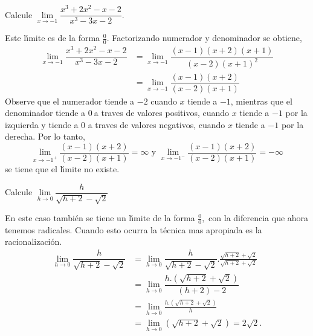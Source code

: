 \begin{example}
Calcule $\lim\limits_{x\rightarrow-1}\dfrac{x^{3}+2x^{2}-x-2}{x^{3}-3x-2}.$
\end{example}

\begin{sol}
Este l\'{\i}mite es de la forma $\frac{0}{0}.$ Factorizando numerador y
denominador se obtiene,%
\begin{align*}
\lim\limits_{x\rightarrow-1}\dfrac{x^{3}+2x^{2}-x-2}{x^{3}-3x-2}  &
=\lim\limits_{x\rightarrow-1}\dfrac{\left(  x-1\right)  \left(  x+2\right)
\left(  x+1\right)  }{\left(  x-2\right)  \left(  x+1\right)  ^{2}}\\
&  =\lim\limits_{x\rightarrow-1}\dfrac{\left(  x-1\right)  \left(  x+2\right)
}{\left(  x-2\right)  \left(  x+1\right)  }%
\end{align*}
Observe que el numerador tiende a $-2$ cuando $x$ tiende a $-1$, mientras que
el denominador tiende a $0\ $a traves de valores positivos, cuando $x$ tiende
a $-1$ por la izquierda y tiende a $0$ a traves de valores negativos, cuando
$x$ tiende a $-1$ por la derecha. Por lo tanto,%
\[
\lim\limits_{x\rightarrow-1^{+}}\dfrac{\left(  x-1\right)  \left(  x+2\right)
}{\left(  x-2\right)  \left(  x+1\right)  }=\infty\text{ \ y \ }%
\lim\limits_{x\rightarrow-1^{-}}\dfrac{\left(  x-1\right)  \left(  x+2\right)
}{\left(  x-2\right)  \left(  x+1\right)  }=-\infty
\]
se tiene que el l\'{\i}mite no existe.
\end{sol}

\begin{example}
Calcule $\lim\limits_{h\rightarrow0}\dfrac{h}{\sqrt{h+2}-\sqrt{2}}$
\end{example}

\begin{sol}
En este caso tambi\'{e}n se tiene un l\'{\i}mite de la forma $\frac{0}{0},$
con la diferencia que ahora tenemos radicales. Cuando esto ocurra la
t\'{e}cnica mas apropiada es la racionalizaci\'{o}n.%
\begin{align*}
\lim\limits_{h\rightarrow0}\dfrac{h}{\sqrt{h+2}-\sqrt{2}}  &  =\lim
\limits_{h\rightarrow0}\dfrac{h}{\sqrt{h+2}-\sqrt{2}}.\frac{\sqrt{h+2}%
+\sqrt{2}}{\sqrt{h+2}+\sqrt{2}}\\
&  =\lim\limits_{h\rightarrow0}\dfrac{h.(\sqrt{h+2}+\sqrt{2})}{\left(
h+2\right)  -2}\\
&  =\lim\limits_{h\rightarrow0}\frac{h.(\sqrt{h+2}+\sqrt{2})}{h}\\
&  =\lim\limits_{h\rightarrow0}(\sqrt{h+2}+\sqrt{2})=2\sqrt{2}.
\end{align*}

\end{sol}

